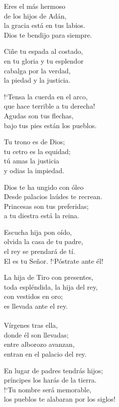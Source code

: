 \documentclass[12pt, letterpaper]{report}
\begin{document}
    \begin{multicols}{2}
      \noindent
      Eres el m\'as hermoso\\
      de los hijos de Ad\'an,\\
      la gracia est\'a en tus labios.\\
      Dios te bendijo para siempre.

      \noindent
      Ci\~ne tu espada al costado,\\
      en tu gloria y tu esplendor\\
      cabalga por la verdad,\\
      la piedad y la justicia.

      \noindent
      !`Tensa la cuerda en el arco,\\
      que hace terrible a tu derecha!\\
      Agudas son tus flechas,\\
      bajo tus pies est\'an los pueblos.

      \noindent
      Tu trono es de Dios;\\
      tu cetro es la equidad;\\
      t\'u amas la justicia\\
      y odias la impiedad.

      \noindent
      Dios te ha ungido con \'oleo\\
      Desde palacios la\'udes te recrean.\\
      Princesas son tus preferidas;\\
      a tu diestra est\'a la reina.

      \noindent
      Escucha hija pon o\'ido,\\
      olvida la casa de tu padre,\\
      el rey se prendar\'a de t\'i.\\
      El es tu Se\~nor. !`P\'ostrate ante \'el!

      \noindent
      La hija de Tiro con presentes,\\
      toda espl\'endida, la hija del rey,\\
      con vestidos en oro;\\
      es llevada ante el rey.
      \\
      \\

      \noindent
      V\'irgenes tras ella,\\
      donde \'el son llevadas;\\
      entre alborozo avanzan,\\
      entran en el palacio del rey.

      \noindent
      En lugar de padres tendr\'as hijos;\\
      pr\'incipes los har\'as de la tierra.\\
      !`Tu nombre ser\'a memorable,\\
      los pueblos te alabaran por los siglos!
      \clearpage
    \end{multicols}
\end{document}
